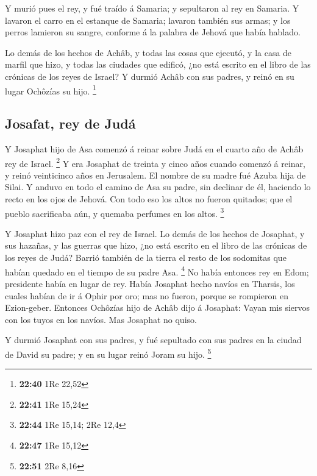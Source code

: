  Y murió pues el rey, y fué traído á Samaria; y
sepultaron al rey en Samaria.  Y lavaron el carro en el
estanque de Samaria; lavaron también sus armas; y los perros lamieron su
sangre, conforme á la palabra de Jehová que había hablado.

 Lo demás de los hechos de Achâb, y todas las cosas que
ejecutó, y la casa de marfil que hizo, y todas las ciudades que edificó,
¿no está escrito en el libro de las crónicas de los reyes de Israel?
 Y durmió Achâb con sus padres, y reinó en su lugar
Ochôzías su hijo. \footnote{\textbf{22:40} 1Re 22,52}

\hypertarget{josafat-rey-de-juduxe1}{%
\subsection{Josafat, rey de Judá}\label{josafat-rey-de-juduxe1}}

 Y Josaphat hijo de Asa comenzó á reinar sobre Judá en el
cuarto año de Achâb rey de Israel. \footnote{\textbf{22:41} 1Re 15,24}
 Y era Josaphat de treinta y cinco años cuando comenzó á
reinar, y reinó veinticinco años en Jerusalem. El nombre de su madre fué
Azuba hija de Silai.  Y anduvo en todo el camino de Asa
su padre, sin declinar de él, haciendo lo recto en los ojos de Jehová.
 Con todo eso los altos no fueron quitados; que el pueblo
sacrificaba aún, y quemaba perfumes en los altos. \footnote{\textbf{22:44}
  1Re 15,14; 2Re 12,4}

 Y Josaphat hizo paz con el rey de Israel.
 Lo demás de los hechos de Josaphat, y sus hazañas, y las
guerras que hizo, ¿no está escrito en el libro de las crónicas de los
reyes de Judá?  Barrió también de la tierra el resto de
los sodomitas que habían quedado en el tiempo de su padre Asa.
\footnote{\textbf{22:47} 1Re 15,12}  No había entonces
rey en Edom; presidente había en lugar de rey.  Había
Josaphat hecho navíos en Tharsis, los cuales habían de ir á Ophir por
oro; mas no fueron, porque se rompieron en Ezion-geber. 
Entonces Ochôzías hijo de Achâb dijo á Josaphat: Vayan mis siervos con
los tuyos en los navíos. Mas Josaphat no quiso.

 Y durmió Josaphat con sus padres, y fué sepultado con
sus padres en la ciudad de David su padre; y en su lugar reinó Joram su
hijo. \footnote{\textbf{22:51} 2Re 8,16}

